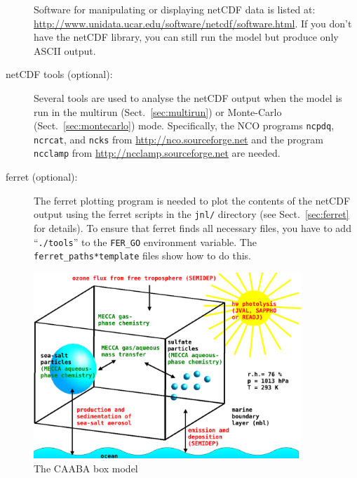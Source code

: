 \documentclass[twoside]{article}
\begin{document}
\begin{description}
  Software for manipulating or displaying netCDF data is listed at:
  \url{http://www.unidata.ucar.edu/software/netcdf/software.html}. If
  you don't have the netCDF library, you can still run the model but
  produce only ASCII output.
\item[netCDF tools (optional):] Several tools are used to analyse the
  netCDF output when the model is run in the multirun
  (Sect.~\ref{sec:multirun}) or Monte-Carlo (Sect.~\ref{sec:montecarlo})
  mode. Specifically, the NCO programs \verb|ncpdq|, \verb|ncrcat|, and
  \verb|ncks| from \url{http://nco.sourceforge.net} and the program
  \verb|ncclamp| from \url{http://ncclamp.sourceforge.net} are needed.
\item[ferret (optional):] The ferret plotting program is needed to plot
  the contents of the netCDF output using the ferret scripts in the
  \verb|jnl/| directory (see Sect.~\ref{sec:ferret} for details). To
  ensure that ferret finds all necessary files, you have to add
  ``\verb|./tools|'' to the \verb|FER_GO| environment variable. The
  \verb|ferret_paths*template| files show how to do this.
\end{description}

\begin{figure}%
  \begin{center}
  \includegraphics[width=0.9\textwidth]{caaba_sketch}
  \end{center}
  \caption{The CAABA box model}
  \label{fig:caaba_sketch}
\end{figure}
\end{document}
